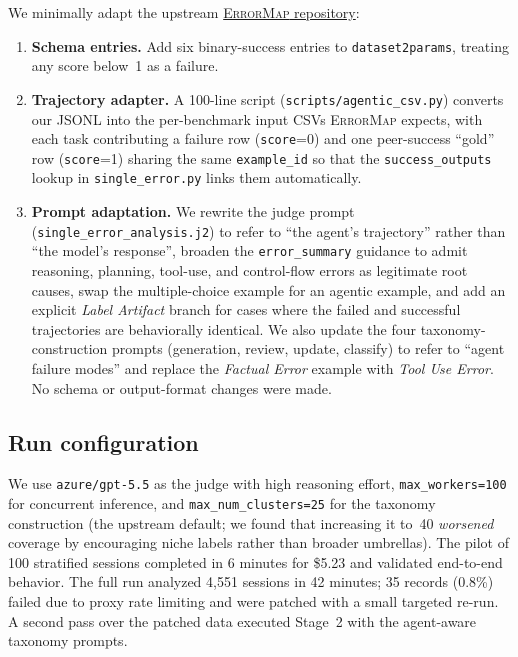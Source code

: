 \documentclass[11pt]{article}
\begin{document}
We minimally adapt the upstream
\href{https://github.com/IBM/ErrorMap}{\textsc{ErrorMap} repository}:

\begin{enumerate}
\item \textbf{Schema entries.} Add six binary-success entries to
\texttt{dataset2params}, treating any score below~1 as a failure.
\item \textbf{Trajectory adapter.} A 100-line script
(\texttt{scripts/agentic\_csv.py}) converts our JSONL into the per-benchmark
input CSVs \textsc{ErrorMap} expects, with each task contributing
a failure row (\texttt{score}=0) and one peer-success ``gold'' row
(\texttt{score}=1) sharing the same \texttt{example\_id} so that the
\texttt{success\_outputs} lookup in \texttt{single\_error.py} links
them automatically.
\item \textbf{Prompt adaptation.} We rewrite the judge prompt
(\texttt{single\_error\_analysis.j2}) to refer to ``the agent's
trajectory'' rather than ``the model's response'', broaden the
\texttt{error\_summary} guidance to admit reasoning, planning,
tool-use, and control-flow errors as legitimate root causes, swap
the multiple-choice example for an agentic example, and add an
explicit \emph{Label Artifact} branch for cases where the failed
and successful trajectories are behaviorally identical. We also
update the four taxonomy-construction prompts (generation, review,
update, classify) to refer to ``agent failure modes'' and replace
the \emph{Factual Error} example with \emph{Tool Use Error}. No
schema or output-format changes were made.
\end{enumerate}

\subsection{Run configuration}

We use \texttt{azure/gpt-5.5} as the judge with high reasoning
effort, \texttt{max\_workers=100} for concurrent inference, and
\texttt{max\_num\_clusters=25} for the taxonomy construction (the
upstream default; we found that increasing it to~40 \emph{worsened}
coverage by encouraging niche labels rather than broader umbrellas).
The pilot of 100 stratified sessions completed in 6 minutes for
\$5.23 and validated end-to-end behavior. The full run analyzed
4{,}551 sessions in 42 minutes; 35 records (0.8\%) failed due to
proxy rate limiting and were patched with a small targeted re-run.
A second pass over the patched data executed Stage~2 with the
agent-aware taxonomy prompts.
\end{document}
